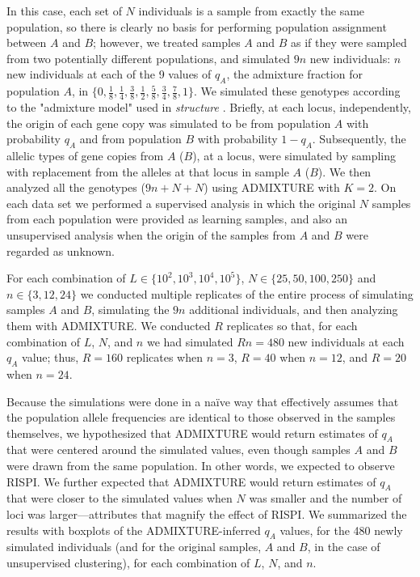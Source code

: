 In this case,
each set of $N$ individuals is a sample from exactly the same population, so
there is clearly no basis for performing population assignment between $A$ and $B$;
however, we treated samples $A$ and $B$ as if they were sampled from two potentially different
populations, and simulated $9n$ new individuals: $n$ new individuals at each of the 9 values of
$q_A$, the admixture fraction for population $A$, in  $\{0, \frac{1}{8}, \frac{1}{4}, \frac{3}{8}, \frac{1}{2}, \frac{5}{8}, \frac{3}{4}, \frac{7}{8}, 1\}$.
We simulated these genotypes according to the "admixture model" used in {\em structure} \citep{pritchard2000inference}.  Briefly, at each
locus, independently, the origin
of each gene copy was simulated to be from
population $A$ with probability $q_A$ and from population $B$ with probability $1-q_A$.  Subsequently,
the allelic types of gene copies from $A$ ($B$), at a locus, were simulated by sampling with replacement
from the alleles at that locus in sample $A$ ($B$).
We then analyzed all the genotypes ($9n + N + N$) using ADMIXTURE with $K=2$. On each data set we performed a supervised analysis in which the original
$N$ samples from each
population were provided as learning samples, and also an
unsupervised analysis when the origin of the samples from $A$ and $B$ were regarded as unknown.

For each combination of $L \in \{10^2, 10^3, 10^4, 10^5\}$,
$N \in \{25, 50, 100, 250\}$ and $n\in\{3,12,24\}$ we conducted multiple replicates
of the entire process of
simulating samples $A$ and $B$, simulating the $9n$ additional individuals, and
then analyzing them with ADMIXTURE.  We conducted $R$ replicates so that,
for each combination of $L$, $N$, and $n$ we had simulated $Rn=480$ new individuals
at each $q_A$ value; thus, $R=160$ replicates when $n = 3$, $R=40$ when $n=12$, and
$R=20$ when $n=24$.


Because the simulations were done in a na\"{i}ve way that effectively assumes that the population
allele frequencies are identical to those observed in the samples themselves, we hypothesized that ADMIXTURE would return estimates of
$q_A$ that were
centered around the simulated values, even though samples $A$ and $B$ were drawn from the same
population. In other words, we expected to observe RISPI.
We further expected that ADMIXTURE would return estimates of $q_A$ that were closer
to the simulated values when $N$ was smaller and the number of loci was larger---attributes that magnify the effect of RISPI.
We summarized the results with boxplots of the ADMIXTURE-inferred $q_A$ values,
 for the 480 newly simulated individuals (and for the original samples, $A$ and $B$, in the
 case of unsupervised clustering),
for each combination of $L$, $N$, and $n$.

